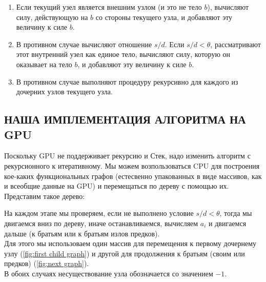 \documentclass{article}
\renewcommand{\baselinestretch}{1.5}
\begin{document}
\begin{enumerate}[label=\Alph*)]
\item Если текущий узел является внешним узлом (и это не тело $b$), вычисляют силу, действующую на $b$ со стороны текущего узла, и добавляют эту величину к силе $b$.
\item В противном случае вычисляют отношение $s/d$. Если $s/d < \theta$, рассматривают этот внутренний узел как единое тело, вычисляют силу, которую он оказывает на тело $b$, и добавляют эту величину к силе $b$.
\item В противном случае выполняют процедуру рекурсивно для каждого из дочерних узлов текущего узла.
\end{enumerate}

\vspace{2\baselinestretch pt}
\subsection{НАША ИМПЛЕМЕНТАЦИЯ АЛГОРИТМА НА GPU}
Поскольку GPU не поддерживает рекурсию и Стек, надо изменить алгоритм с рекурсионного к итеративному.
Мы можем возпользоваться CPU для построения кое-каких функциональных графов (естесвенно упакованных в виде массивов, как и всеобщие данные на GPU) и перемещаться по дереву с помощью их.
Представим такое дерево:
\begin{figure}[H]
  \centering
\end{figure}
На каждом этапе мы проверяем, если не выполнено условие $s/d < \theta$, тогда мы двигаемся вниз по дереву, иначе останавливаемся, вычисляем $a_i$ и двигаемся дальше (к братьям или к братьям излов предков).\\
Для этого мы использоваем один массив для перемещения к первому дочернему узлу (\ref{fig:first child graph}) и другой для продолжения к братьям (своим или предков) (\ref{fig:next graph}).\\
В обоих случаях несуществование узла обозначается со значением $-1$.
\end{document}

